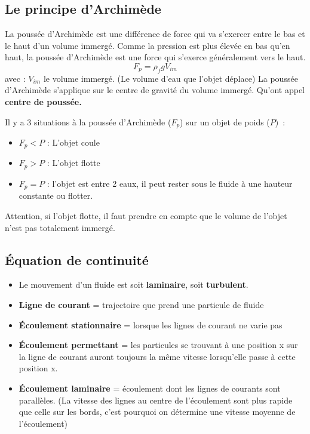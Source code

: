 \documentclass{article}
\begin{document}
\subsection{Le principe d'Archimède}
La poussée d'Archimède est une différence de force qui va s'exercer entre le bas et le haut d'un volume immergé. Comme la pression est plus élevée en bas qu'en haut, la poussée d'Archimède est une force qui s'exerce généralement vers le haut.
\[F_p = \rho_fgV_{im}\]
avec :
\newline
$V_{im}$ le volume immergé. (Le volume d'eau que l'objet déplace)
\newline
La poussée d'Archimède s'applique sur le centre de gravité du volume immergé. Qu'ont appel \textbf{centre de poussée. }
\newline

Il y a 3 situations à la poussée d'Archimède ($F_p$) sur un objet de poids ($P$) :
\begin{itemize}
    \item $F_p < P$ : L'objet coule
    \item $F_p > P$ : L'objet flotte
    \item $F_p = P$ : l'objet est entre 2 eaux, il peut rester sous le fluide à une hauteur constante ou flotter.
\end{itemize}
Attention, si l'objet flotte, il faut prendre en compte que le volume de l'objet n'est pas totalement immergé.

\subsection{Équation de continuité}
\begin{itemize}
    \item Le mouvement d'un fluide est soit \textbf{laminaire}, soit \textbf{turbulent}.
    \item \textbf{Ligne de courant} = trajectoire que prend une particule de fluide
    \item \textbf{Écoulement stationnaire} = lorsque les lignes de courant ne varie pas
    \item \textbf{Écoulement permettant} = les particules se trouvant à une position x sur la ligne de courant auront toujours la même vitesse lorsqu'elle passe à cette position x.
    \item \textbf{Écoulement laminaire} = écoulement dont les lignes de courants sont parallèles. (La vitesse des lignes au centre de l'écoulement sont plus rapide que celle sur les bords, c'est pourquoi on détermine une vitesse moyenne de l'écoulement)
\end{itemize}
\newline
\end{document}
